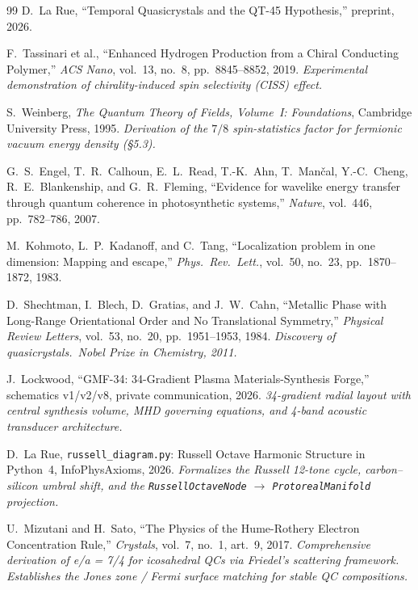 \begin{thebibliography}{99}
D.~La Rue,
``Temporal Quasicrystals and the QT-45 Hypothesis,''
preprint, 2026.

F.~Tassinari et al.,
``Enhanced Hydrogen Production from a Chiral Conducting Polymer,''
\emph{ACS Nano}, vol.~13, no.~8, pp.~8845--8852, 2019.
\textit{Experimental demonstration of chirality-induced spin selectivity (CISS) effect.}

S.~Weinberg,
\emph{The Quantum Theory of Fields, Volume~I: Foundations},
Cambridge University Press, 1995.
\textit{Derivation of the $7/8$ spin-statistics factor for fermionic vacuum energy density (\S5.3).}


G.~S.~Engel, T.~R.~Calhoun, E.~L.~Read, T.-K.~Ahn, T.~Man\v{c}al, Y.-C.~Cheng,
R.~E.~Blankenship, and G.~R.~Fleming,
``Evidence for wavelike energy transfer through quantum coherence in photosynthetic systems,''
\emph{Nature}, vol.~446, pp.~782--786, 2007.

M.~Kohmoto, L.~P.~Kadanoff, and C.~Tang,
``Localization problem in one dimension: Mapping and escape,''
\emph{Phys.\ Rev.\ Lett.}, vol.~50, no.~23, pp.~1870--1872, 1983.

D.~Shechtman, I.~Blech, D.~Gratias, and J.~W.~Cahn,
``Metallic Phase with Long-Range Orientational Order and No Translational Symmetry,''
\emph{Physical Review Letters}, vol.~53, no.~20, pp.~1951--1953, 1984.
\textit{Discovery of quasicrystals.\ Nobel Prize in Chemistry, 2011.}

J.~Lockwood,
``GMF-34: 34-Gradient Plasma Materials-Synthesis Forge,''
schematics v1/v2/v8, private communication, 2026.
\textit{34-gradient radial layout with central synthesis volume, MHD governing equations, and 4-band acoustic transducer architecture.}

D.~La Rue,
\texttt{russell\_diagram.py}: Russell Octave Harmonic Structure in Python~4,
InfoPhysAxioms, 2026.
\textit{Formalizes the Russell 12-tone cycle, carbon--silicon umbral shift, and the \texttt{RussellOctaveNode} $\to$ \texttt{ProtorealManifold} projection.}

U.~Mizutani and H.~Sato,
``The Physics of the Hume-Rothery Electron Concentration Rule,''
\emph{Crystals}, vol.~7, no.~1, art.~9, 2017.
\textit{Comprehensive derivation of e/a = 7/4 for icosahedral QCs via Friedel's scattering framework. Establishes the Jones zone / Fermi surface matching for stable QC compositions.}


\end{thebibliography}
